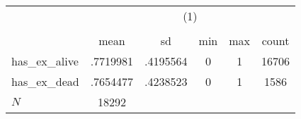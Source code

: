 \begin{table}[htbp]\centering
\def\sym#1{\ifmmode^{#1}\else\(^{#1}\)\fi}
\caption{}
\begin{tabular}{l*{1}{ccccc}}
\hline\hline
            &\multicolumn{5}{c}{(1)}                                         \\
            &\multicolumn{5}{c}{}                                            \\
            &        mean&          sd&         min&         max&       count\\
\hline
has\_ex\_alive&    .7719981&    .4195564&           0&           1&       16706\\
has\_ex\_dead &    .7654477&    .4238523&           0&           1&        1586\\
\hline
\(N\)       &       18292&            &            &            &            \\
\hline\hline
\end{tabular}
\end{table}
